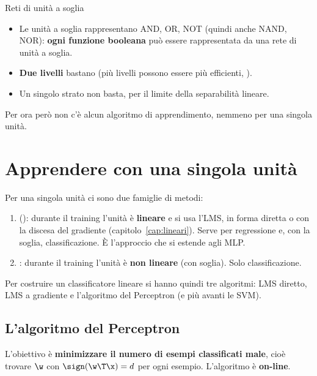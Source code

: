 \begin{proprieta}{Reti di unità a soglia}
\begin{itemize}
  \item Le unità a soglia rappresentano AND, OR, NOT (quindi anche NAND, NOR): \textbf{ogni funzione booleana} può
        essere rappresentata da una rete di unità a soglia.
  \item \textbf{Due livelli} bastano (più livelli possono essere più efficienti, ).
  \item Un singolo strato non basta, per il limite della separabilità lineare.
\end{itemize}
Per ora però non c'è alcun algoritmo di apprendimento, nemmeno per una singola unità.
\end{proprieta}

\section{Apprendere con una singola unità}

Per una singola unità ci sono due famiglie di metodi:
\begin{enumerate}
  \item {} (): durante il training l'unità è \textbf{lineare} e si usa
        l'LMS, in forma diretta o con la discesa del gradiente (capitolo~\ref{cap:lineari}). Serve per regressione
        e, con la soglia, classificazione. È l'approccio che si estende agli MLP.
  \item {}: durante il training l'unità è \textbf{non lineare} (con soglia). Solo
        classificazione.
\end{enumerate}
Per costruire un classificatore lineare si hanno quindi tre algoritmi: LMS diretto, LMS a gradiente e
l'algoritmo del Perceptron (e più avanti le SVM).

\subsection{L'algoritmo del Perceptron}

L'obiettivo è \textbf{minimizzare il numero di esempi classificati male}, cioè trovare $\w$ con
$\sign(\w\T\x) = d$ per ogni esempio. L'algoritmo è \textbf{on-line}.

